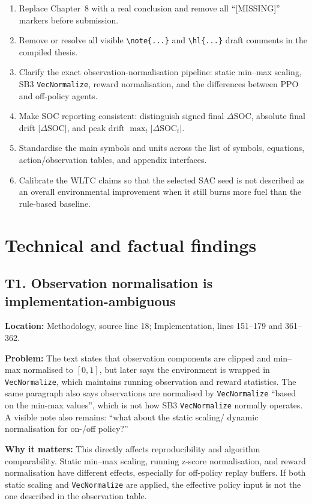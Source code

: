 \documentclass[11pt,a4paper]{article}
\newcommand{\loc}[1]{\textbf{Location:} #1\par}
\newcommand{\problem}{\textbf{Problem:} }
\newcommand{\why}{\textbf{Why it matters:} }
\begin{document}
\begin{enumerate}
  \item Replace Chapter~8 with a real conclusion and remove all ``[MISSING]'' markers before submission.
  \item Remove or resolve all visible \texttt{\textbackslash note\{...\}} and \texttt{\textbackslash hl\{...\}} draft comments in the compiled thesis.
  \item Clarify the exact observation-normalisation pipeline: static min--max scaling, SB3 \texttt{VecNormalize}, reward normalisation, and the differences between PPO and off-policy agents.
  \item Make SOC reporting consistent: distinguish signed final $\Delta\mathrm{SOC}$, absolute final drift $|\Delta\mathrm{SOC}|$, and peak drift $\max_t |\Delta\mathrm{SOC}_t|$.
  \item Standardise the main symbols and units across the list of symbols, equations, action/observation tables, and appendix interfaces.
  \item Calibrate the WLTC claims so that the selected SAC seed is not described as an overall environmental improvement when it still burns more fuel than the rule-based baseline.
\end{enumerate}

\section*{Technical and factual findings}

\subsection*{T1. Observation normalisation is implementation-ambiguous}

\loc{Methodology, source line 18; Implementation, lines 151--179 and 361--362.}
\problem The text states that observation components are clipped and min--max normalised to $[0,1]$, but later says the environment is wrapped in \texttt{VecNormalize}, which maintains running observation and reward statistics. The same paragraph also says observations are normalised by \texttt{VecNormalize} ``based on the min-max values'', which is not how SB3 \texttt{VecNormalize} normally operates. A visible note also remains: ``what about the static scaling/ dynamic normalisation for on-/off policy?''

\why This directly affects reproducibility and algorithm comparability. Static min--max scaling, running z-score normalisation, and reward normalisation have different effects, especially for off-policy replay buffers. If both static scaling and \texttt{VecNormalize} are applied, the effective policy input is not the one described in the observation table.
\end{document}
